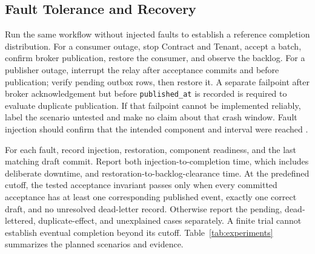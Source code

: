 \subsection{Fault Tolerance and Recovery}
Run the same workflow without injected faults to establish a reference completion distribution. For a consumer outage, stop Contract and Tenant, accept a batch, confirm broker publication, restore the consumer, and observe the backlog. For a publisher outage, interrupt the relay after acceptance commits and before publication; verify pending outbox rows, then restore it. A separate failpoint after broker acknowledgement but before \texttt{published\_at} is recorded is required to evaluate duplicate publication. If that failpoint cannot be implemented reliably, label the scenario untested and make no claim about that crash window. Fault injection should confirm that the intended component and interval were reached \cite{meiklejohn2021faultinjection}.

For each fault, record injection, restoration, component readiness, and the last matching draft commit. Report both injection-to-completion time, which includes deliberate downtime, and restoration-to-backlog-clearance time. At the predefined cutoff, the tested acceptance invariant passes only when every committed acceptance has at least one corresponding published event, exactly one correct draft, and no unresolved dead-letter record. Otherwise report the pending, dead-lettered, duplicate-effect, and unexplained cases separately. A finite trial cannot establish eventual completion beyond its cutoff. Table~\ref{tab:experiments} summarizes the planned scenarios and evidence.


